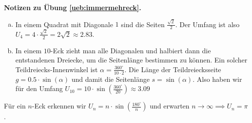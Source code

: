 \documentclass[%
11pt,%
twoside,%
titlepage,%
german,%
headsepline%
]{scrartcl}
\newcommand{\concatueb}[1]{ueb:#1}%
\newcommand{\concatlsg}[1]{lsg:#1}%
\newenvironment{lsg}[1]{%
    \par\noindent\textbf{Notizen zu Übung \ref{\concatueb{#1}}.}%
    \label{\concatlsg{#1}}
}{%
    \par%
}
\begin{document}
\begin{lsg}{immermehreck}
\begin{enumerate}[a)]
\item In einem Quadrat mit Diagonale $1$ sind die Seiten $\frac{\sqrt{2}}{2}$. Der Umfang ist also $U_{4}=4\cdot\frac{\sqrt{2}}{2}=2\sqrt{2}\approx2.83$.
\item In einem $10$-Eck zieht man alle Diagonalen und halbiert dann die entstandenen Dreiecke, um die Seitenl\"ange bestimmen zu k\"onnen. Ein solcher Teildreiecks-Innenwinkel ist $\alpha=\frac{360^{\circ}}{10\cdot2}$. Die L\"ange der Teildreiecksseite $g=0.5\cdot\sin(\alpha)$ und damit die Seitenl\"ange $s=\sin(\alpha)$. Also haben wir f\"ur den Umfang $U_{10}=10\cdot\sin(\frac{360^{\circ}}{20})\approx3.09$
\end{enumerate}
F\"ur ein $n$-Eck erkennen wir $U_{n}=n\cdot\sin(\frac{180^{\circ}}{n})$ und erwarten $n\to\infty\implies U_{n}=\pi$.
\end{lsg}
\end{document}
